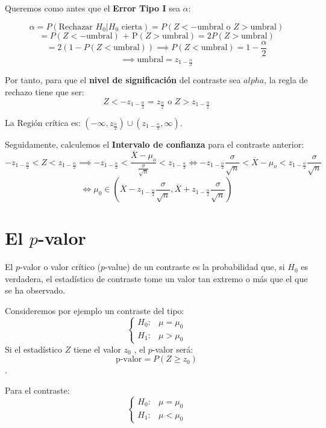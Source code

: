 \documentclass[
]{article}
\begin{document}
Queremos como antes que el \textbf{Error Tipo I} sea \(\alpha\):

\[\alpha = P(\text{Rechazar }H_0|H_0\text{ cierta}) = P(Z < -\text{umbral o } Z > \text{umbral})\]
\[= P(Z < -\text{umbral}) \text{ + P} (Z > \text{umbral}) = 2P(Z > \text{umbral})\]
\[= 2(1 - P(Z < \text{umbral})) \implies P(Z < \text{umbral}) = 1 - \frac{\alpha}{2}\]
\[\implies \text{umbral} = z_{1-\frac{\alpha}{2}}\]

Por tanto, para que el \textbf{nivel de significación} del contraste sea
\(alpha\), la regla de rechazo tiene que ser:
\[Z < -z_{1-\frac{\alpha}{2}} = z_{\frac{\alpha}{2}} \text{ o } Z > z_{1-\frac{\alpha}{2}}\]

La Región crítica es:
\((- \infty,z_{\frac{\alpha}{2}}) \cup (z_{1-\frac{\alpha}{2}}, \infty)\).

Seguidamente, calculemos el \textbf{Intervalo de confianza} para el
contraste anterior:
\[-z_{1-\frac{\alpha}{2}} < Z < z_{1-\frac{\alpha}{2}} \implies -z_{1-\frac{\alpha}{2}} < \frac{\overline{X}-\mu_o}{\frac{\sigma}{\sqrt{n}}} < z_{1-\frac{\alpha}{2}} \Leftrightarrow -z_{1-\frac{\alpha}{2}}{\frac{\sigma}{\sqrt{n}}} < \overline{X}-\mu_o < z_{1-\frac{\alpha}{2}}{\frac{\sigma}{\sqrt{n}}}\]
\[\Leftrightarrow \mu_0 \in \left(\overline{X} - z_{1-\frac{\alpha}{2}}{\frac{\sigma}{\sqrt{n}}}, \overline{X} + z_{1-\frac{\alpha}{2}}{\frac{\sigma}{\sqrt{n}}}\right)\]

\hypertarget{el-p-valor}{%
\section{\texorpdfstring{El \(p\)-valor}{El p-valor}}\label{el-p-valor}}

El \(p\)-valor o valor crítico (\(p\)-value) de un contraste es la
probabilidad que, si \(H_0\) es verdadera, el estadístico de contraste
tome un valor tan extremo o más que el que se ha observado.

Consideremos por ejemplo un contraste del tipo: \[
\begin{cases}
H_0 : & \mu = \mu_0\\
H_1 : & \mu > \mu_0
\end{cases}
\] Si el estadístico \(Z\) tiene el valor \(z_0\) , el \(p\)-valor será:
\[ \text{p-valor} = P(Z \geq z_0)\].

Para el contraste: \[
\begin{cases}
H_0 : & \mu = \mu_0\\
H_1 : & \mu < \mu_0
\end{cases}
\]
\end{document}
